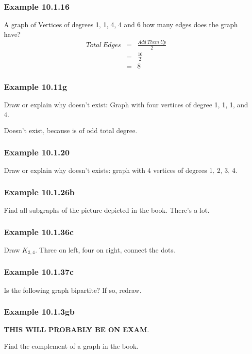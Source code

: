 \documentclass{article}
\begin{document}
\setcounter{section}{10}
\setcounter{subsection}{1}

\subsubsection{Example 10.1.16}
A graph of Vertices of degrees 1, 1, 4, 4 and 6 how many edges does the graph have?
\begin{eqnarray}
Total\ Edges & = & \frac{Add\ Them\ Up}{2} \\
& = & \frac{16}{2} \\
& = & 8
\end{eqnarray}

\subsubsection{Example 10.11g} Draw or explain why doesn't exist: Graph with four vertices of degree 1, 1, 1, and 4.

\noindent
Doesn't exist, because is of odd total degree.

\subsubsection{Example 10.1.20}
Draw or explain why doesn't exists: graph with 4 vertices of degrees 1, 2, 3, 4.

\subsubsection{Example 10.1.26b}
Find all subgraphs of the picture depicted in the book. There's a lot.

\subsubsection{Example 10.1.36c}
Draw $K_{3,4}$. Three on left, four on right, connect the dots.

\subsubsection{Example 10.1.37c}
Is the following graph bipartite? If so, redraw.

\subsubsection{Example 10.1.3gb}
\textbf{THIS WILL PROBABLY BE ON EXAM}.

Find the complement of a graph in the book.
\end{document}
